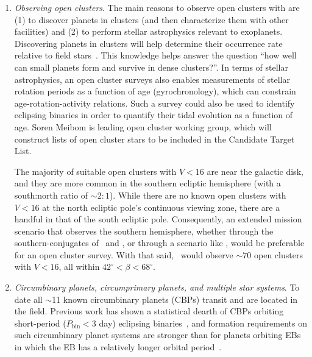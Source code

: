 \begin{enumerate}
	\item \textit{Observing open clusters}.
	The main reasons to observe open clusters with \tess are (1) to discover planets in clusters (and then characterize them with other facilities) and (2) to perform stellar astrophysics relevant to exoplanets.
	Discovering planets in clusters will help determine their occurrence rate relative to field stars~\citep{meibom_same_2013}.
	This knowledge helps answer the question ``how well can small planets form and survive in dense clusters?''. 
	In terms of stellar astrophysics, an open cluster surveys also enables measurements of stellar rotation periods as a function of age (gyrochronology), which can constrain age-rotation-activity relations.
	Such a survey could also be used to identify eclipsing binaries in order to quantify their tidal evolution as a function of age.
	Soren Meibom is leading \tesss open cluster working group, which will construct lists of open cluster stars to be included in the \tess Candidate Target List.
	
	The majority of suitable open clusters with $V<16$ are near the galactic disk, and they are more common in the southern ecliptic hemisphere (with a south:north ratio of $\sim\!2:1$).
	While there are no known open clusters with $V<16$ at the north ecliptic pole's continuous viewing zone, there are a handful in that of the south ecliptic pole.
	Consequently, an extended mission scenario that observes the southern hemisphere, whether through the southern-conjugates of \nhemi\ and \npole, or through a scenario like \shemiAvoid, would be preferable for an open cluster survey.
	With that said, \npole\ would observe $\sim70$ open clusters with $V<16$, all within $42^\circ<\beta<68^\circ$.
	
	\item \textit{Circumbinary planets, circumprimary planets, and multiple star systems}.
	To date all $\sim$11 known circumbinary planets (CBPs) transit and are located in the \kepler field.
	Previous work has shown a statistical dearth of CBPs orbiting short-period ($P_\mathrm{bin} < 3$ day) eclipsing binaries~\citep{armstrong_abundance_2014,martin_planets_2014}, and formation requirements on such circumbinary planet systems are stronger than for planets orbiting EBs in which the EB has a relatively longer orbital period~\citep{martin_no_2015}.
	

\end{enumerate}
